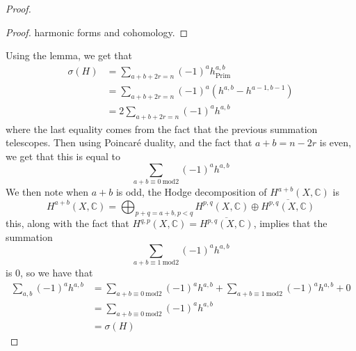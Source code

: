 \documentclass[psamsfonts, 12pt]{amsart}
\theoremstyle{definition}
\theoremstyle{remark}
\newcommand{\C}{\mathbb{C}}
\begin{document}
\begin{proof}
\begin{proof}
harmonic forms and cohomology.
\end{proof}
%
Using the lemma, we get that
\begin{align*}
\sigma(H) &= \sum_{a+b+2r=n}(-1)^ah^{a,b}_{\mathrm{Prim}} \\
&= \sum_{a+b+2r=n}(-1)^a(h^{a,b}-h^{a-1,b-1}) \\
&= 2 \sum_{a+b+2r=n}(-1)^ah^{a,b}
\end{align*}
where the last equality comes from the fact that the previous summation telescopes.
Then using Poincar\'e duality, and the fact that $a+b = n-2r$ is even, we get that
this is equal to
\[
\sum_{a+b\equiv 0~\mathrm{mod} 2} (-1)^ah^{a,b}
\]
We then note when $a+b$ is odd, the Hodge decomposition of $H^{a+b}(X,\C)$ is
\[
H^{a+b}(X,\C) = \bigoplus_{p+q=a+b, p < q}H^{p,q}(X,\C)\oplus\overline{H^{p,q}(X,\C)}
\]
this, along with the fact that $H^{q,p}(X,\C) = \overline{H^{p,q}(X,\C)}$, implies
that the summation
\[
\sum_{a+b\equiv 1~\mathrm{mod} 2} (-1)^ah^{a,b}
\]
is $0$, so we have that
\begin{align*}
\sum_{a,b}(-1)^{a}h^{a,b} &= \sum_{a+b\equiv 0~\mathrm{mod} 2} (-1)^ah^{a,b}
+ \sum_{a+b\equiv 1~\mathrm{mod} 2} (-1)^ah^{a,b} + 0\\
&= \sum_{a+b\equiv 0~\mathrm{mod} 2} (-1)^ah^{a,b} \\
&= \sigma(H)
\end{align*}
%
\end{proof}
\end{document}
